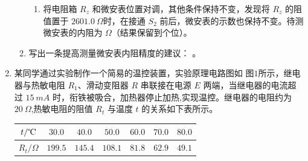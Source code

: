 \begin{enumerate}
\begin{enumerate}
\begin{enumerate}
\item 
将电阻箱 $ R_z $ 和微安表位置对调，其他条件保持不变，发现将 $ R_z $ 的阻值置于 $ 2601.0 \ \Omega $时，在接通
$ S_{2} $ 前后，微安表的示数也保持不变。待测微安表的内阻为
\underlinegap 
$ \Omega $（结果保留到个位）。


\end{enumerate}


\item 
写出一条提高测量微安表内阻精度的建议：
\hfullline 
。


\end{enumerate}







\item
{}
某同学通过实验制作一个简易的温控装置，实验原理电路图如
图$ 1 $所示，继电器与热敏电阻 $ R_{1} $、滑动变阻器 $ R $ 串联接在电源 $ E $ 两端，当继电器的电流超过 $ 15 \ mA $
时，衔铁被吸合，加热器停止加热,实现温控。继电器的电阻约为 $ 20 \ \Omega $,热敏电阻的阻值 $ R_t $ 与温度 $ t $
的关系如下表所示。
\begin{table}[h!]
\centering 
\begin{tabular}{|c|c|c|c|c|c|c|}
\hline 
$ t/ \celsius $ & $ 30.0 $ & $ 40.0 $ & $ 50.0 $ & $ 60.0 $ & $ 70.0 $ & $ 80.0 $
 \\
\hline
$ R_t/ \Omega $ & $ 199.5 $ & $ 145.4 $ & $ 108.1 $ & $ 81.8 $ & $ 62.9 $ & $ 49.1 $\\ 
\hline 
\end{tabular}
\end{table} 


\end{enumerate}
